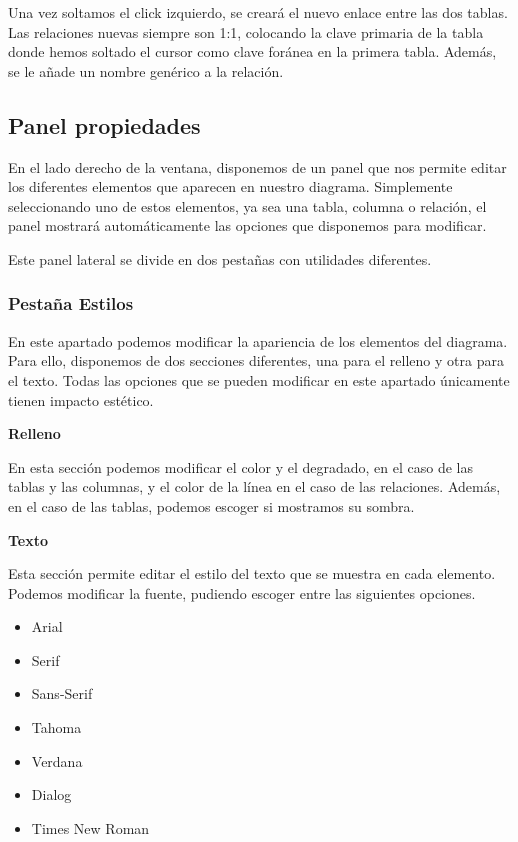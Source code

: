 Una vez soltamos el click izquierdo, se creará el nuevo enlace entre las dos tablas. Las relaciones nuevas siempre son 1:1, colocando la clave primaria de la tabla donde hemos soltado el cursor como clave foránea en la primera tabla. Además, se le añade un nombre genérico a la relación.


\subsection{Panel propiedades}
En el lado derecho de la ventana, disponemos de un panel que nos permite editar los diferentes elementos que aparecen en nuestro diagrama. Simplemente seleccionando uno de estos elementos, ya sea una tabla, columna o relación, el panel mostrará automáticamente las opciones que disponemos para modificar.


Este panel lateral se divide en dos pestañas con utilidades diferentes.

\subsubsection{Pestaña Estilos}
En este apartado podemos modificar la apariencia de los elementos del diagrama. Para ello, disponemos de dos secciones diferentes, una para el relleno y otra para el texto. Todas las opciones que se pueden modificar en este apartado únicamente tienen impacto estético.

\textbf{Relleno}


En esta sección podemos modificar el color y el degradado, en el caso de las tablas y las columnas, y el color de la línea en el caso de las relaciones. Además, en el caso de las tablas, podemos escoger si mostramos su sombra.

\textbf{Texto}


Esta sección permite editar el estilo del texto que se muestra en cada elemento. Podemos modificar la fuente, pudiendo escoger entre las siguientes opciones.
\begin{itemize}
    \item Arial
    \item Serif
    \item Sans-Serif
    \item Tahoma
    \item Verdana
    \item Dialog
    \item Times New Roman
\end{itemize}

